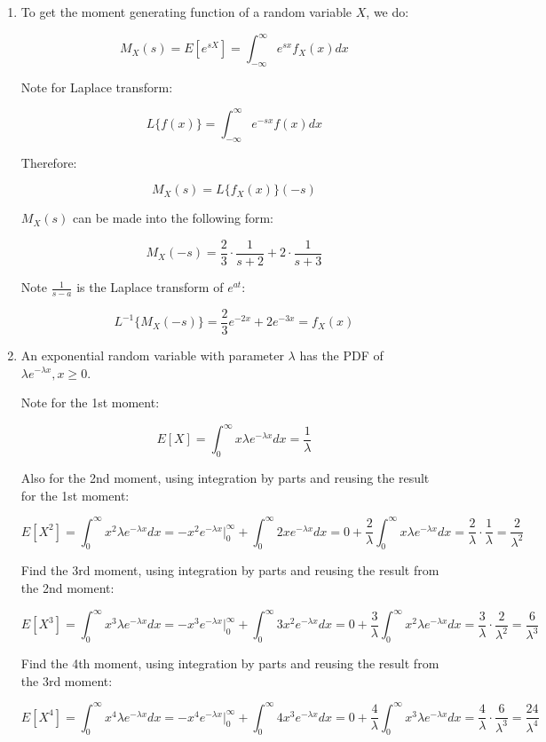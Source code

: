 \documentclass[11pt,letterpaper,titlepage]{article}
\begin{document}
\begin{enumerate}
    \item To get the moment generating function of a random variable $ X $, we do:
    
    $$ M_{X} (s) = E[e^{sX}] = \int_{-\infty}^{\infty} e^{s x} f_{X} (x) dx $$
    
    Note for Laplace transform:
    
    $$ L\{f(x)\}  = \int_{-\infty}^{\infty} e^{-sx} f(x) dx $$
    
    Therefore:
    
    $$ M_{X} (s) = L\{f_{X} (x)\}(-s) $$
    
    $ M_{X} (s) $ can be made into the following form:
    
    $$ M_{X} (-s) = \frac{2}{3} \cdot \frac{1}{s + 2} + 2 \cdot \frac{1}{s + 3} $$
    
    Note $ \frac{1}{s - a} $ is the Laplace transform of $ e^{at} $:
    
    $$ L^{-1} \{M_{X} (-s)\}  = \frac{2}{3} e^{-2x} + 2 e^{-3x} = f_{X}(x) $$
    
    \item An exponential random variable with parameter $ \lambda $ has the PDF of $ \lambda e^{-\lambda x}, x \geq 0 $.
    
    Note for the 1st moment:
    
    $$ E[X] = \int_{0}^{\infty} x \lambda e^{-\lambda x} dx = \frac{1}{\lambda} $$
    
    Also for the 2nd moment, using integration by parts and reusing the result for the 1st moment:
    
    $$ E[X^2] = \int_{0}^{\infty} x^2 \lambda e^{-\lambda x} dx = -x^2 e^{-\lambda x}\Big|_{0}^{\infty} + \int_{0}^{\infty} 2x e^{-\lambda x} dx = 0 + \frac{2}{\lambda} \int_{0}^{\infty} x \lambda e^{-\lambda x} dx = \frac{2}{\lambda} \cdot \frac{1}{\lambda} = \frac{2}{\lambda^2} $$

    Find the 3rd moment, using integration by parts and reusing the result from the 2nd moment:
    
    $$ E[X^3] = \int_{0}^{\infty} x^3 \lambda e^{-\lambda x} dx = -x^3 e^{-\lambda x}\Big|_{0}^{\infty} + \int_{0}^{\infty} 3x^2 e^{-\lambda x} dx =  0 + \frac{3}{\lambda} \int_{0}^{\infty} x^2 \lambda e^{-\lambda x} dx = \frac{3}{\lambda} \cdot \frac{2}{\lambda^2} = \frac{6}{\lambda^3} $$
    
    Find the 4th moment, using integration by parts and reusing the result from the 3rd moment:
    
    $$ E[X^4] = \int_{0}^{\infty} x^4 \lambda e^{-\lambda x} dx  = -x^4 e^{-\lambda x}\Big|_{0}^{\infty} + \int_{0}^{\infty} 4 x^3 e^{-\lambda x} dx  =   0 + \frac{4}{\lambda} \int_{0}^{\infty} x^3 \lambda e^{-\lambda x} dx = \frac{4}{\lambda} \cdot \frac{6}{\lambda^3} = \frac{24}{\lambda^4} $$
    

\end{enumerate}
\end{document}

